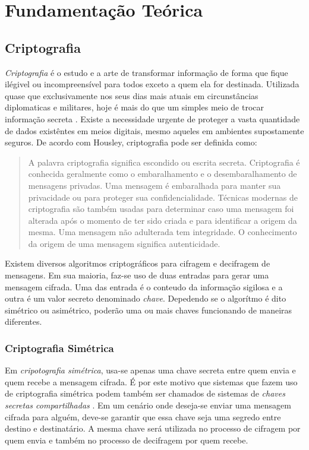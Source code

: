 \chapter{Fundamentação Teórica}

\section{Criptografia}
\textit{Criptografia} é o estudo e a arte de transformar informação de forma que fique ilégivel ou incompreensível para todos exceto 
a quem ela for destinada. Utilizada quase que exclusivamente nos seus dias mais atuais em circunstâncias diplomaticas e militares, hoje 
é mais do que um simples meio de trocar informação secreta \cite{Luciano}. Existe a necessidade urgente de proteger a vasta quantidade de dados existêntes 
em meios digitais, mesmo aqueles em ambientes supostamente seguros. 
De acordo com Housley, criptografia pode ser definida como:
\begin{quote}
\footnotesize{
A palavra criptografia significa escondido ou escrita secreta. Criptografia é conhecida geralmente como o 
embaralhamento e o desembaralhamento de mensagens privadas. Uma mensagem é embaralhada para manter sua privacidade 
ou para proteger sua confidencialidade. Técnicas modernas de criptografia são também usadas para determinar caso uma mensagem 
foi alterada após o momento de ter sido criada e para identificar a origem da mesma. Uma mensagem não adulterada tem integridade. 
O conhecimento da origem de uma mensagem significa autenticidade.
} \cite[p.-5]{Planning}
\end{quote}

Existem diversos algoritmos criptográficos para cifragem e decifragem de mensagens. Em sua maioria, faz-se uso de duas entradas para gerar uma mensagem cifrada. 
Uma das entrada é o conteudo da informação sigilosa e a outra é um valor secreto denominado \textit{chave}. Depedendo se o algorítmo é dito simétrico ou asimétrico, 
poderão uma ou mais chaves funcionando de maneiras diferentes. 

\subsection{Criptografia Simétrica}
Em \textit{cripotografia simétrica}, usa-se apenas uma chave secreta entre quem envia e quem recebe a mensagem cifrada. É por este motivo que sistemas que fazem uso de 
criptografia simétrica podem também ser chamados de sistemas de \textit{chaves secretas compartilhadas} \cite{Planning}. Em um cenário onde deseja-se enviar uma mensagem 
cifrada para alguém, deve-se garantir que essa chave seja uma segredo entre destino e destinatário. A mesma chave será utilizada no processo de cifragem por quem envia e também no 
processo de decifragem por quem recebe.
   
